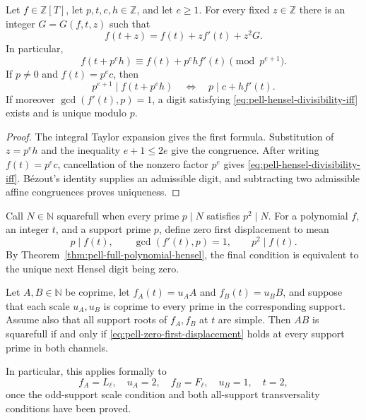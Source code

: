 \begin{theorem}
\label{thm:pell-full-polynomial-hensel}
Let $f\in\mathbb Z[T]$, let $p,t,c,h\in\mathbb Z$, and let $e\geq1$.
For every fixed $z\in\mathbb Z$ there is an integer
$G=G(f,t,z)$ such that
\[
 f(t+z)=f(t)+zf'(t)+z^2G.
\]
In particular,
\[
 f(t+p^eh)\equiv f(t)+p^ehf'(t)\pmod {p^{e+1}}.
\]
If $p\neq0$ and $f(t)=p^ec$, then
\begin{equation}\label{eq:pell-hensel-divisibility-iff}
 p^{e+1}\mid f(t+p^eh)
 \quad\Longleftrightarrow\quad
 p\mid c+hf'(t).
\end{equation}
If moreover $\gcd(f'(t),p)=1$, a digit satisfying
\eqref{eq:pell-hensel-divisibility-iff} exists and is
unique modulo $p$.
\end{theorem}

\begin{proof}
The integral Taylor expansion gives the first formula.  Substitution of
$z=p^eh$ and the inequality $e+1\leq2e$ give the congruence.  After writing
$f(t)=p^ec$, cancellation of the nonzero factor $p^e$ gives
\eqref{eq:pell-hensel-divisibility-iff}.
B\'ezout's identity supplies an admissible digit, and subtracting two
admissible affine congruences proves uniqueness.
\end{proof}

Call $N\in\mathbb N$ squarefull when every prime $p\mid N$ satisfies
$p^2\mid N$.  For a polynomial $f$, an integer $t$, and a support prime
$p$, define zero first displacement to mean
\begin{equation}\label{eq:pell-zero-first-displacement}
 p\mid f(t),\qquad \gcd(f'(t),p)=1,
 \qquad p^2\mid f(t).
\end{equation}
By Theorem~\ref{thm:pell-full-polynomial-hensel}, the final condition is
equivalent to the unique next Hensel digit being zero.

\begin{proposition}
\label{prop:pell-all-support-equivalence}
Let $A,B\in\mathbb N$ be coprime, let
$f_A(t)=u_AA$ and $f_B(t)=u_BB$, and suppose that each scale $u_A,u_B$ is
coprime to every prime in the corresponding support.  Assume also that all
support roots of $f_A,f_B$ at $t$ are simple.  Then $AB$ is squarefull if
and only if \eqref{eq:pell-zero-first-displacement} holds at every support
prime in both channels.

In particular, this applies formally to
\[
 f_A=L_\ell,\quad u_A=2,\quad
 f_B=F_\ell,\quad u_B=1,\quad t=2,
\]
once the odd-support scale condition and both all-support transversality
conditions have been proved.
\end{proposition}

